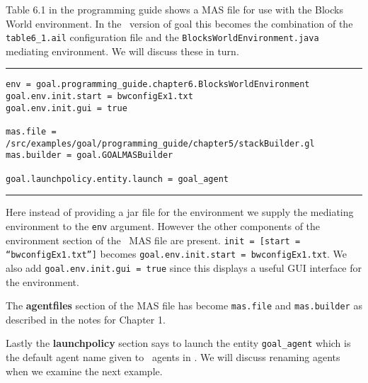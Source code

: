 Table 6.1 in the programming guide shows a MAS file for use with the Blocks World environment.  In the \ail\ version of goal this becomes the combination of the \texttt{table6\_1.ail} configuration file and the \texttt{BlocksWorldEnvironment.java} mediating environment.  We will discuss these in turn.

\noindent\rule{\textwidth}{1pt}
\begin{small}
\begin{verbatim}
env = goal.programming_guide.chapter6.BlocksWorldEnvironment
goal.env.init.start = bwconfigEx1.txt
goal.env.init.gui = true

mas.file = /src/examples/goal/programming_guide/chapter5/stackBuilder.gl
mas.builder = goal.GOALMASBuilder

goal.launchpolicy.entity.launch = goal_agent
\end{verbatim}
\end{small}
\rule{\textwidth}{1pt}

Here instead of providing a jar file for the environment we supply the mediating environment to the \texttt{env} argument.  However the other components of the environment section of the \goal\ MAS file are present.  \texttt{init = [start = ``bwconfigEx1.txt'']} becomes \texttt{goal.env.init.start = bwconfigEx1.txt}.  We also add \texttt{goal.env.init.gui = true} since this displays a useful GUI interface for the environment.

The {\bf agentfiles} section of the MAS file has become \texttt{mas.file} and \texttt{mas.builder} as described in the notes for Chapter 1.

Lastly the {\bf launchpolicy} section says to launch the entity \texttt{goal\_agent} which is the default agent name given to \goal\ agents in \ail.  We will discuss renaming agents when we examine the next example.

